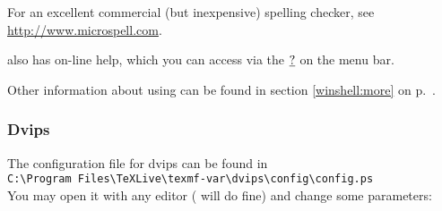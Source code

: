 \documentclass{article}
\begin{document}
For an excellent commercial (but inexpensive) spelling checker,
see \url{http://www.microspell.com}.

%

 also has on-line help, which you can access via the
$\textbf{\underbar{?}}$ on the menu bar.

Other information about using  can be found in
section \ref{winshell:more} on p.~\pageref{winshell:more}.

\subsubsection{Dvips}

The configuration file for dvips can be found in\\
\verb+C:\Program Files\TeXLive\texmf-var\dvips\config\config.ps+\\
You may open  it with any editor  (  will do fine) and  change
some parameters:
\end{document}
